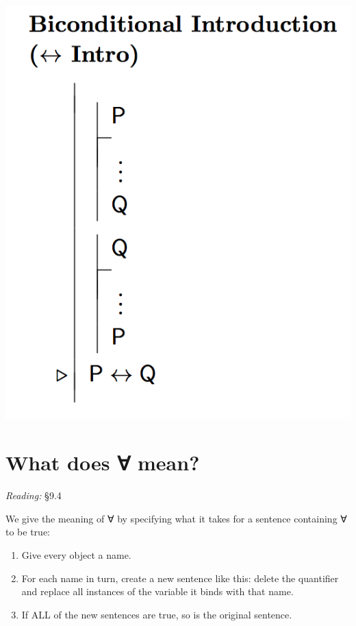 \documentclass[12pt]{extarticle}
\begin{document}
\begin{multicols*}{3}
\begin{center}
\includegraphics[scale=0.3]{img/rule_biconditional_intro.png}
\end{center}
 
 
\section{What does ∀ mean?}
 
\emph{Reading:} §9.4
 
We give the meaning of ∀ by specifying what it takes for a sentence containing ∀ to be true:
 
\begin{enumerate}
 
\item Give every object a name.
 
\item For each name in turn, create a new sentence like this: delete the quantifier and replace all instances of the variable it binds with that name.
 
\item If ALL of the new sentences are true, so is the original sentence.
 

\end{enumerate}
\end{multicols*}
\end{document}
